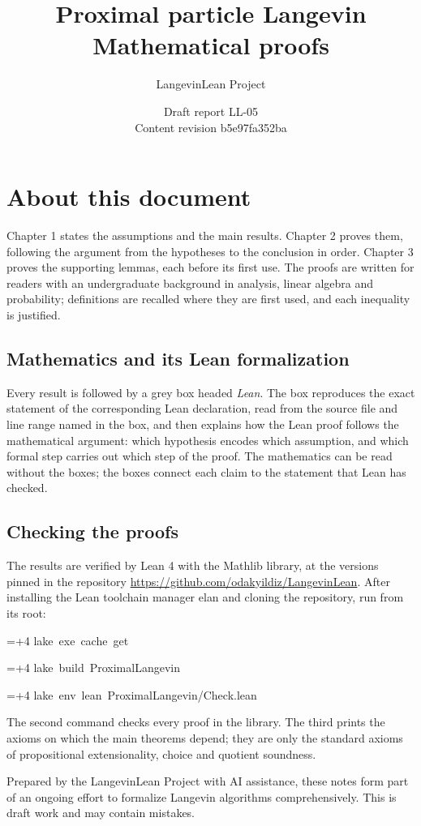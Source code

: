 \documentclass[11pt,a4paper]{report}
\title{\texorpdfstring{Proximal particle Langevin}{Proximal particle Langevin}\\[0.6em]\large Mathematical proofs}
\author{LangevinLean Project}
\date{Draft report LL-05\\[0.4em]\small Content revision b5e97fa352ba}
\newlength{\leancharwidth}
\newenvironment{leancode}{\par\smallskip\begingroup\ttfamily\footnotesize\raggedright
  \settowidth{\leancharwidth}{M}\setlength{\parskip}{0pt}\setlength{\parindent}{0pt}
  \frenchspacing}{\par\endgroup\smallskip}
\newcommand{\leanline}[2]{\hangindent=\dimexpr#1\leancharwidth+4\leancharwidth\relax
  \hangafter=1\noindent\hspace*{#1\leancharwidth}#2\par}
\begin{document}
\maketitle
\chapter*{About this document}
Chapter 1 states the assumptions and the main results. Chapter 2 proves them, following the argument from the hypotheses to the conclusion in order. Chapter 3 proves the supporting lemmas, each before its first use. The proofs are written for readers with an undergraduate background in analysis, linear algebra and probability; definitions are recalled where they are first used, and each inequality is justified.

\section*{Mathematics and its Lean formalization}
Every result is followed by a grey box headed \emph{Lean}. The box reproduces the exact statement of the corresponding Lean declaration, read from the source file and line range named in the box, and then explains how the Lean proof follows the mathematical argument: which hypothesis encodes which assumption, and which formal step carries out which step of the proof. The mathematics can be read without the boxes; the boxes connect each claim to the statement that Lean has checked.

\section*{Checking the proofs}
The results are verified by Lean 4 with the Mathlib library, at the versions pinned in the repository \url{https://github.com/odakyildiz/LangevinLean}. After installing the Lean toolchain manager elan and cloning the repository, run from its root:
\begin{leancode}
\leanline{0}{lake\ exe\ cache\ get}
\leanline{0}{lake\ build\ ProximalLangevin}
\leanline{0}{lake\ env\ lean\ ProximalLangevin/Check.lean}
\end{leancode}
The second command checks every proof in the library. The third prints the axioms on which the main theorems depend; they are only the standard axioms of propositional extensionality, choice and quotient soundness.

Prepared by the LangevinLean Project with AI assistance, these notes form part of an ongoing effort to formalize Langevin algorithms comprehensively. This is draft work and may contain mistakes.
\end{document}
